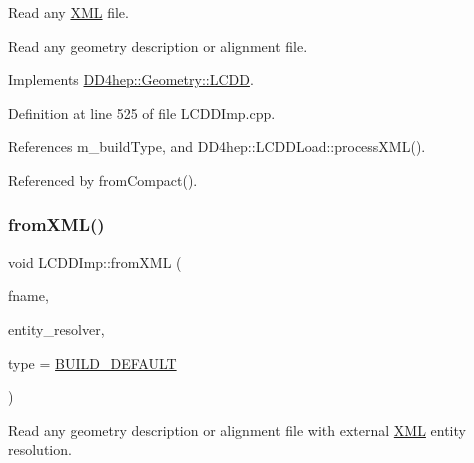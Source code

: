 Read any \hyperlink{namespace_d_d4hep_1_1_x_m_l}{X\+ML} file. 

Read any geometry description or alignment file. 

Implements \hyperlink{class_d_d4hep_1_1_geometry_1_1_l_c_d_d_ad6e8de7ab4f0374cea7e3e15e33af66e}{D\+D4hep\+::\+Geometry\+::\+L\+C\+DD}.



Definition at line 525 of file L\+C\+D\+D\+Imp.\+cpp.



References m\+\_\+build\+Type, and D\+D4hep\+::\+L\+C\+D\+D\+Load\+::process\+X\+M\+L().



Referenced by from\+Compact().

\hypertarget{class_d_d4hep_1_1_geometry_1_1_l_c_d_d_imp_ae1c435032cd33235cd6405ca8d8aae9b}{}\label{class_d_d4hep_1_1_geometry_1_1_l_c_d_d_imp_ae1c435032cd33235cd6405ca8d8aae9b} 
\subsubsection{\texorpdfstring{from\+X\+M\+L()}{fromXML()}\hspace{0.1cm}{\footnotesize\ttfamily [2/2]}}
{\footnotesize\ttfamily void L\+C\+D\+D\+Imp\+::from\+X\+ML (\begin{DoxyParamCaption}\item[{const std\+::string \&}]{fname,  }\item[{\hyperlink{class_d_d4hep_1_1_geometry_1_1_l_c_d_d_a69f1e3e4fbcef1d57f1df1c2bd85918f}{Uri\+Reader} $\ast$}]{entity\+\_\+resolver,  }\item[{\hyperlink{namespace_d_d4hep_acafe43ba4537ab6e999e808142965fab}{L\+C\+D\+D\+Build\+Type}}]{type = {\ttfamily \hyperlink{namespace_d_d4hep_acafe43ba4537ab6e999e808142965fabaceac720f961afd2369fcc9f343113a2e}{B\+U\+I\+L\+D\+\_\+\+D\+E\+F\+A\+U\+LT}} }\end{DoxyParamCaption})\hspace{0.3cm}{\ttfamily [virtual]}}



Read any geometry description or alignment file with external \hyperlink{namespace_d_d4hep_1_1_x_m_l}{X\+ML} entity resolution. 



